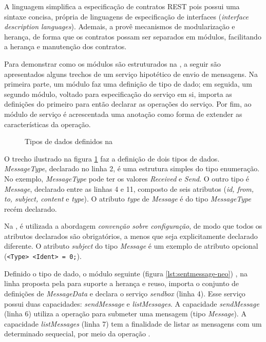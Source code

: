 A linguagem \neoidl{} simplifica a especificação de contratos REST pois possui
uma sintaxe concisa, própria de linguagens de especificação de interfaces
(\emph{interface description languages}). Ademais, a \neoidl{} provê mecanismos de
modularização e herança, de forma que os contratos possam ser separados em
módulos, facilitando a herança e manutenção dos
contratos. 

Para demonstrar como os módulos são estruturados na
\neoidl{}, a seguir são apresentados alguns trechos de um serviço hipotético
de envio de mensagens. Na primeira parte, um módulo faz uma definição de tipo
de dado; em seguida, um segundo módulo, voltado para especificação do serviço em
si, importa as definições do primeiro para então declarar as operações do
serviço. Por fim, ao módulo de serviço é acrescentada uma anotação como
forma de extender as características da operação.

\vspace{6mm}

\begin{figure}[h]
\begin{small}

\vspace{-.5cm}
\end{small} 
\caption{Tipos de dados definidos na \neoidl}
\label{lst:messagedata-neo}
\end{figure}

O trecho ilustrado na figura \ref{lst:messagedata-neo} faz a definição de dois
tipos de dados. \emph{MessageType}, declarado no linha 2, é uma estrutura
simples do tipo enumeração. No exemplo, \emph{MessageType} pode ter os valores
\emph{Received} e \emph{Send}.
O outro tipo é \emph{Message}, declarado entre as linhas 4 e 11,
composto de seis atributos (\emph{id, from, to, subject, content} e
\emph{type}).
O atributo \emph{type} de \emph{Message} é do tipo \emph{MessageType} recém declarado.

Na \neoidl{}, é utilizada a abordagem \emph{convenção sobre configuração}, de
modo que todos os atributos declarados são obrigatórios, a menos que
seja explicitamente declarado diferente. O atributo \emph{subject} do tipo
\emph{Message} é um exemplo de atributo opcional (\texttt{<Type> <Ident> = 0;}).

Definido o tipo de dado, o módulo seguinte (figura \ref{lst:sentmessage-neo})
, na linha proposta pela \neoidl{} para suporte a herança
e reuso, importa o conjunto de definições de \emph{MessageData} e declara o
serviço \emph{sendbox} (linha 4). Esse serviço possui duas capacidades:
\emph{sendMessage} e \emph{listMessages}.
A capacidade \emph{sendMessage} (linha 6) utiliza a operação  para
submeter uma mensagem (tipo \emph{Message}). A capacidade \emph{listMessages}
(linha 7) tem a finalidade de listar as mensagens com um determinado sequecial,
por meio da operação .

